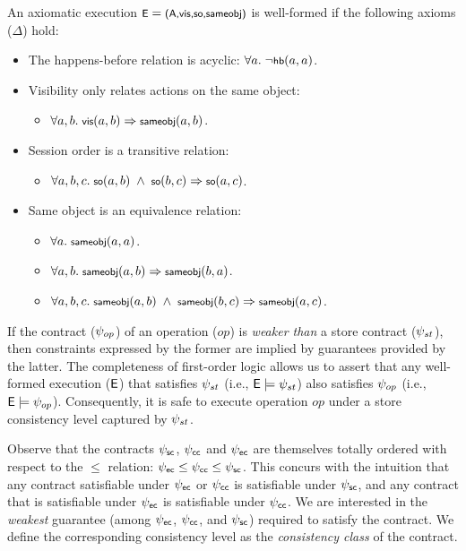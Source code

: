 \begin{definition}
An axiomatic execution $\small \E = \Exec$ is well-formed if the
following axioms ($\Delta$) hold:

\begin{itemize}
\item The happens-before relation is acyclic: $\small \forall a.~\neg\hb{a}{a}$.
\item Visibility only relates actions on the same object:
	\begin{itemize}
	\item $\small \forall a,b.~\vis{a}{b} \Rightarrow \sameobj{a}{b}$.
	\end{itemize}
\item Session order is a transitive relation:
	\begin{itemize}
	\item $\small \forall a,b,c.~\so{a}{b} ~\wedge~ \so{b}{c} \Rightarrow \so{a}{c}$.
	\end{itemize}
\item Same object is an equivalence relation:
	\begin{itemize}
	\item $\small \forall a.~\sameobj{a}{a}$.
	\item $\small \forall a,b.~\sameobj{a}{b} \Rightarrow \sameobj{b}{a}$.
	\item $\small \forall a,b,c.~\sameobj{a}{b} ~\wedge~ \sameobj{b}{c} \Rightarrow \sameobj{a}{c}$.
	\end{itemize}
\end{itemize}
\end{definition}

If the contract ($\psi_{op}$) of an operation ($\mathit{op}$) is \emph{weaker
than} a store contract ($\psi_{st}$), then constraints expressed by the former
are implied by guarantees provided by the latter. The completeness of
first-order logic allows us to assert that any well-formed execution (${\normalfont \textsf{E}}$)
that satisfies $\psi_{st}$ (i.e., ${\normalfont \textsf{E}}\models \psi_{st}$) also satisfies
$\psi_{op}$ (i.e., ${\normalfont \textsf{E}} \models \psi_{op}$). Consequently, it is safe to execute
operation $\mathit{op}$ under a store consistency level captured by $\psi_{st}$.

Observe that the contracts $\psi_{\sf sc}$, $\psi_{\sf cc}$ and $\psi_{\sf ec}$ are themselves totally
ordered with respect to the $\le$ relation: $\psi_{\sf ec} \le \psi_{\sf cc} \le \psi_{\sf sc}$.  This
concurs with the intuition that any contract satisfiable under $\psi_{\sf ec}$ or $\psi_{\sf cc}$
is satisfiable under $\psi_{\sf sc}$, and any contract that is satisfiable under $\psi_{\sf ec}$
is satisfiable under $\psi_{\sf cc}$. We are interested in the \emph{weakest} guarantee
(among $\psi_{\sf ec}$, $\psi_{\sf cc}$, and $\psi_{\sf sc}$) required to satisfy the contract. We define
the corresponding consistency level as the \emph{consistency class} of the
contract.

